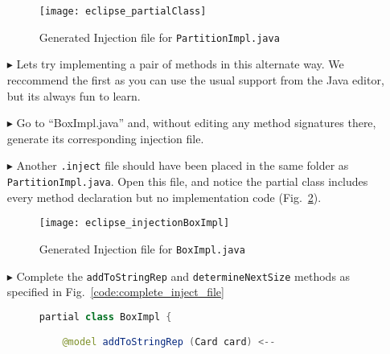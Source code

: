 \begin{itemize}
\begin{figure}[htbp]
    \centering
    \texttt{[image: eclipse\_partialClass]}
    \caption{Generated Injection file for \texttt{PartitionImpl.java}}
    \label{fig:injection_partialClassPartition}
\end{figure}

\clearpage

\item[$\blacktriangleright$] Lets try implementing a pair of methods in this alternate way. We reccommend the first as you can use the usual support
from the Java editor, but its always fun to learn.

\vspace{0.5cm}

\item[$\blacktriangleright$] Go to ``BoxImpl.java'' and, without editing any method signatures there, generate its corresponding injection file.

\vspace{0.5cm}

\item[$\blacktriangleright$] Another \texttt{.inject} file should have been placed in the same folder as \texttt{PartitionImpl.java}. Open this file, and notice
the partial class includes every method declaration but no implementation code (Fig.~\ref{fig:injection_partialClassBox}).

\vspace{0.5cm}

\begin{figure}[htbp]
    \centering
    \texttt{[image: eclipse\_injectionBoxImpl]}
    \caption{Generated Injection file for \texttt{BoxImpl.java}}
    \label{fig:injection_partialClassBox}
\end{figure}

\vspace{0.5cm}

\item[$\blacktriangleright$] Complete the \texttt{addToStringRep} and \texttt{determineNextSize} methods as specified in Fig.~\ref{code:complete_inject_file}

\begin{figure}[htbp]
        \centering
        \begin{lstlisting}[language=Java, keywordstyle={\bfseries\color{purple}}, backgroundcolor=\color{white}]
partial class BoxImpl {

    @model addToStringRep (Card card) <--


\end{lstlisting}
\end{figure}
\end{itemize}
